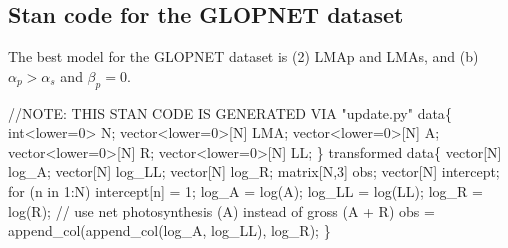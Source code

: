 \documentclass[
  12pt,
  letterpaper,
  DIV=11,
  numbers=noendperiod]{scrartcl}
\newenvironment{Shaded}{\begin{snugshade}}{\end{snugshade}}
\newcommand{\AlertTok}[1]{\textcolor[rgb]{0.68,0.00,0.00}{#1}}
\newcommand{\CommentTok}[1]{\textcolor[rgb]{0.37,0.37,0.37}{#1}}
\newcommand{\ControlFlowTok}[1]{\textcolor[rgb]{0.00,0.23,0.31}{#1}}
\newcommand{\DataTypeTok}[1]{\textcolor[rgb]{0.68,0.00,0.00}{#1}}
\newcommand{\DecValTok}[1]{\textcolor[rgb]{0.68,0.00,0.00}{#1}}
\newcommand{\KeywordTok}[1]{\textcolor[rgb]{0.00,0.23,0.31}{#1}}
\newcommand{\NormalTok}[1]{\textcolor[rgb]{0.00,0.23,0.31}{#1}}
\begin{document}
\hypertarget{stan-code-for-the-glopnet-dataset}{%
\subsection{Stan code for the GLOPNET
dataset}\label{stan-code-for-the-glopnet-dataset}}

The best model for the GLOPNET dataset is (2) LMAp and LMAs, and (b)
\(\alpha_p > \alpha_s\) and \(\beta_p = 0\).

\begin{Shaded}
\begin{Highlighting}[]
\CommentTok{//}\AlertTok{NOTE}\CommentTok{: THIS STAN CODE IS GENERATED VIA "update.py"}
\KeywordTok{data}\NormalTok{\{}
  \DataTypeTok{int}\NormalTok{\textless{}}\KeywordTok{lower}\NormalTok{=}\DecValTok{0}\NormalTok{\textgreater{} N;}
  \DataTypeTok{vector}\NormalTok{\textless{}}\KeywordTok{lower}\NormalTok{=}\DecValTok{0}\NormalTok{\textgreater{}[N] LMA;}
  \DataTypeTok{vector}\NormalTok{\textless{}}\KeywordTok{lower}\NormalTok{=}\DecValTok{0}\NormalTok{\textgreater{}[N] A;}
  \DataTypeTok{vector}\NormalTok{\textless{}}\KeywordTok{lower}\NormalTok{=}\DecValTok{0}\NormalTok{\textgreater{}[N] R;}
  \DataTypeTok{vector}\NormalTok{\textless{}}\KeywordTok{lower}\NormalTok{=}\DecValTok{0}\NormalTok{\textgreater{}[N] LL;}
\NormalTok{\}}
\KeywordTok{transformed data}\NormalTok{\{}
  \DataTypeTok{vector}\NormalTok{[N] log\_A;}
  \DataTypeTok{vector}\NormalTok{[N] log\_LL;}
  \DataTypeTok{vector}\NormalTok{[N] log\_R;}
  \DataTypeTok{matrix}\NormalTok{[N,}\DecValTok{3}\NormalTok{] obs;}
  \DataTypeTok{vector}\NormalTok{[N] intercept;}
  \ControlFlowTok{for}\NormalTok{ (n }\ControlFlowTok{in} \DecValTok{1}\NormalTok{:N)}
\NormalTok{    intercept[n] = }\DecValTok{1}\NormalTok{;}
\NormalTok{  log\_A = log(A);}
\NormalTok{  log\_LL = log(LL);}
\NormalTok{  log\_R = log(R);}
  \CommentTok{// use net photosynthesis (A) instead of gross (A + R)}
\NormalTok{  obs = append\_col(append\_col(log\_A, log\_LL), log\_R);}
\NormalTok{\}}


\end{Highlighting}
\end{Shaded}
\end{document}
